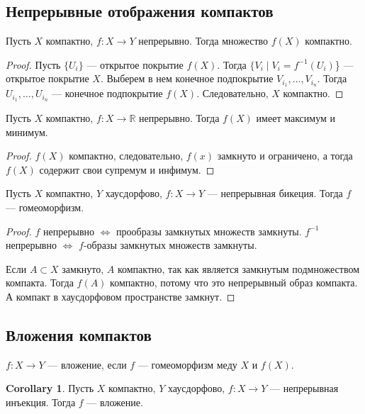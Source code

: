 \documentclass[11pt]{book}
\newcommand{\R}{\mathbb{R}}
\theoremstyle{definition}
\theoremstyle{plain}
\theoremstyle{plain}
\theoremstyle{definition}
\newtheorem*{cor}{Corollary}
\theoremstyle{remark}
\begin{document}
\subsection{Непрерывные отображения компактов}
\begin{thm}
    Пусть $ X$ компактно,  $ f: X \to  Y$ непрерывно.
    Тогда множество  $ f(X)$ компактно.
\end{thm}
\begin{proof}
    Пусть  $ \{U_i\}$ --- открытое покрытие $ f(X)$. Тогда  $ \{V_i \mid V_i = f^{-1}(U_i)$\} ---  открытое покрытие $ X$.
    Выберем в нем конечное подпокрытие  $ V_{i_1}, \ldots , V_{i_n}$. Тогда $ U_{i_1}, \ldots, U_{i_n}$ --- конечное подпокрытие $ f(X)$. Следовательно,  $ X$ компактно.
\end{proof}
\begin{thm}
    Пусть $ X$ компактно,  $ f: X \to  \R$ непрерывно. Тогда $ f(X)$ имеет максимум и минимум.
\end{thm}
\begin{proof}
    $ f(X)$ компактно, следовательно,  $ f(x)$ замкнуто и ограничено, а тогда  $ f(X)$ содержит свои супремум и инфимум.
\end{proof}
\begin{thm}
    Пусть $ X$ компактно,  $ Y$  хаусдорфово, $ f: X \to  Y$ --- непрерывная бикеция. Тогда $ f$ --- гомеоморфизм.
\end{thm}
\begin{proof}
    $ f$ непрерывно  $ \Longleftrightarrow $ прообразы замкнутых множеств замкнуты.
    $ f^{-1}$ непрерывно $ \Longleftrightarrow $ $ f$-образы замкнутых множеств замкнуты.

    Если  $ A \subset X$ замкнуто,
    $ A$ компактно, так как является  замкнутым подмножеством компакта.  Тогда $ f(A)$ компактно, потому что это непрерывный образ компакта. А компакт в хаусдорфовом пространстве замкнут.
\end{proof}
\subsection{Вложения компактов}
\begin{defn}
    $ f: X \to  Y$ --- вложение, если $ f$ ---  гомеоморфизм меду  $ X$ и  $ f(X)$.
\end{defn}
\begin{cor}
    Пусть $ X$ компактно,  $ Y$ хаусдорфово,  $ f: X \to  Y$ --- непрерывная  инъекция. Тогда $ f$ --- вложение.
\end{cor}
\end{document}
